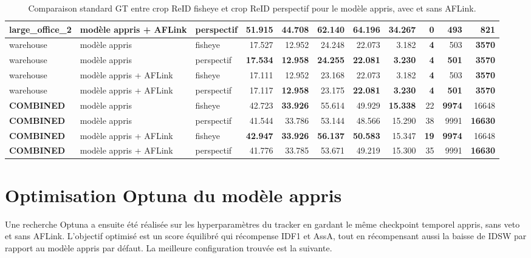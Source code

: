 \documentclass[11pt,a4paper]{article}
\begin{document}
\begin{table}[H]
{\begin{tabular}{l l l r r r r r r r r}
large\_office\_2 & modèle appris + AFLink & perspectif & \textbf{51.915} & 44.708 & \textbf{62.140} & \textbf{64.196} & \textbf{34.267} & \textbf{0} & \textbf{493} & \textbf{821} \\
\midrule
warehouse & modèle appris & fisheye & 17.527 & 12.952 & 24.248 & 22.073 & 3.182 & \textbf{4} & 503 & \textbf{3570} \\
warehouse & modèle appris & perspectif & \textbf{17.534} & \textbf{12.958} & \textbf{24.255} & \textbf{22.081} & \textbf{3.230} & \textbf{4} & \textbf{501} & \textbf{3570} \\
warehouse & modèle appris + AFLink & fisheye & 17.111 & 12.952 & 23.168 & 22.073 & 3.182 & \textbf{4} & 503 & \textbf{3570} \\
warehouse & modèle appris + AFLink & perspectif & 17.117 & \textbf{12.958} & 23.175 & \textbf{22.081} & \textbf{3.230} & \textbf{4} & \textbf{501} & \textbf{3570} \\
\midrule
\textbf{COMBINED} & modèle appris & fisheye & 42.723 & \textbf{33.926} & 55.614 & 49.929 & \textbf{15.338} & 22 & \textbf{9974} & 16648 \\
\textbf{COMBINED} & modèle appris & perspectif & 41.544 & 33.786 & 53.144 & 48.566 & 15.290 & 38 & 9991 & \textbf{16630} \\
\textbf{COMBINED} & modèle appris + AFLink & fisheye & \textbf{42.947} & \textbf{33.926} & \textbf{56.137} & \textbf{50.583} & 15.347 & \textbf{19} & \textbf{9974} & 16648 \\
\textbf{COMBINED} & modèle appris + AFLink & perspectif & 41.776 & 33.785 & 53.671 & 49.219 & 15.300 & 35 & 9991 & \textbf{16630} \\
\bottomrule
\end{tabular}
}
\caption{Comparaison standard GT entre crop ReID fisheye et crop ReID perspectif pour le modèle appris, avec et sans AFLink.}
\end{table}

\section{Optimisation Optuna du modèle appris}

Une recherche Optuna a ensuite été réalisée sur les hyperparamètres du tracker en gardant le même checkpoint temporel appris, sans veto et sans AFLink. L'objectif optimisé est un score équilibré qui récompense IDF1 et AssA, tout en récompensant aussi la baisse de IDSW par rapport au modèle appris par défaut. La meilleure configuration trouvée est la suivante.
\end{document}
